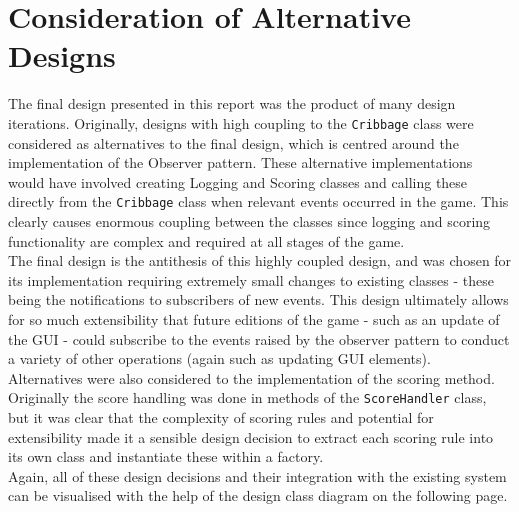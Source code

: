 \documentclass{article}
\begin{document}
\section{Consideration of Alternative Designs}
The final design presented in this report was the product of many design iterations. Originally, designs with high coupling to the \verb|Cribbage| class were considered as alternatives to the final design, which is centred around the implementation of the Observer pattern. These alternative implementations would have involved creating Logging and Scoring classes and calling these directly from the \verb|Cribbage| class when relevant events occurred in the game. This clearly causes enormous coupling between the classes since logging and scoring functionality are complex and required at all stages of the game.\\[2mm]
The final design is the antithesis of this highly coupled design, and was chosen for its implementation requiring extremely small changes to existing classes - these being the notifications to subscribers of new events. This design ultimately allows for so much extensibility that future editions of the game - such as an update of the GUI - could subscribe to the events raised by the observer pattern to conduct a variety of other operations (again such as updating GUI elements).\\[2mm]
Alternatives were also considered to the implementation of the scoring method. Originally the score handling was done in methods of the \verb|ScoreHandler| class, but it was clear that the complexity of scoring rules and potential for extensibility made it a sensible design decision to extract each scoring rule into its own class and instantiate these within a factory.\\[2mm]
Again, all of these design decisions and their integration with the existing system can be visualised with the help of the design class diagram on the following page.


\end{document}
